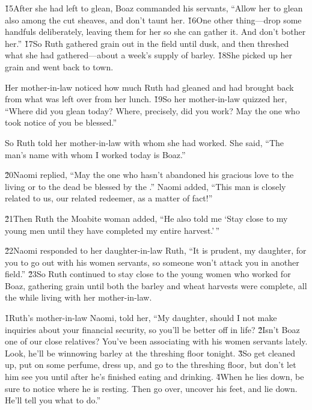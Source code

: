 \v{15}After she had left to glean, Boaz commanded his servants, ``Allow her to glean also among the cut sheaves, and don't taunt her. \v{16}One other thing---drop some handfuls deliberately, leaving them for her so she can gather it. And don't bother her.'' \v{17}So Ruth gathered grain out in the field until dusk, and then threshed what she had gathered---about a week's supply of barley. \v{18}She picked up her grain and went back to town.

Her mother-in-law noticed how much Ruth had gleaned and had brought back from what was left over from her lunch. \v{19}So her mother-in-law quizzed her, ``Where did you glean today? Where, precisely, did you work? May the one who took notice of you be blessed.''

So Ruth told her mother-in-law with whom she had worked. She said, ``The man's name with whom I worked today is Boaz.''

\v{20}Naomi replied, ``May the one who hasn't abandoned his gracious love to the living or to the dead be blessed by the .'' Naomi added, ``This man is closely related to us, our related redeemer, as a matter of fact!''

\v{21}Then Ruth the Moabite woman added, ``He also told me `Stay close to my young men until they have completed my entire harvest.'\,''

\v{22}Naomi responded to her daughter-in-law Ruth, ``It is prudent, my daughter, for you to go out with his women servants, so someone won't attack you in another field.'' \v{23}So Ruth continued to stay close to the young women who worked for Boaz, gathering grain until both the barley and wheat harvests were complete, all the while living with her mother-in-law.

\v{1}Ruth's mother-in-law Naomi, told her, ``My daughter, should I not make inquiries about your financial security, so you'll be better off in life? \v{2}Isn't Boaz one of our close relatives? You've been associating with his women servants lately. Look, he'll be winnowing barley at the threshing floor tonight. \v{3}So get cleaned up, put on some perfume, dress up, and go to the threshing floor, but don't let him see you until after he's finished eating and drinking. \v{4}When he lies down, be sure to notice where he is resting. Then go over, uncover his feet, and lie down. He'll tell you what to do.''

